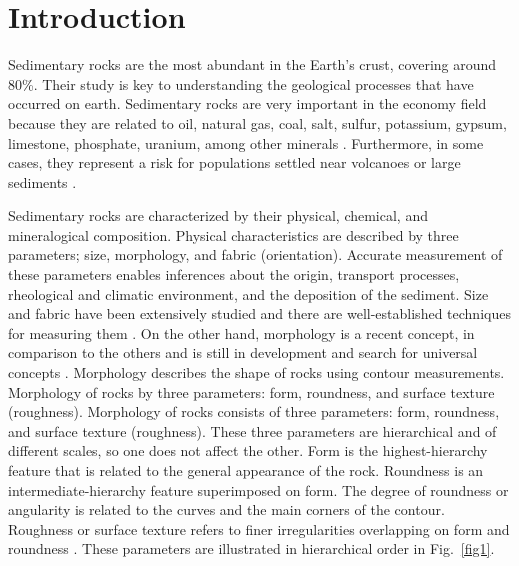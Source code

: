 \documentclass[conference]{IEEEtran}
\begin{document}
\IEEEpeerreviewmaketitle



\section{Introduction}

Sedimentary rocks are the most abundant in the Earth's crust, covering around 80\%. Their study is key to understanding the geological processes that have occurred on earth. Sedimentary rocks are very important in the economy field because they are related to oil, natural gas, coal, salt, sulfur, potassium, gypsum, limestone, phosphate, uranium, among other minerals \cite{b1}. Furthermore, in some cases, they represent a risk for populations settled near volcanoes or large sediments \cite{b2}.

Sedimentary rocks are characterized by their physical, chemical, and mineralogical composition. Physical characteristics are described by three parameters; size, morphology, and fabric (orientation). Accurate measurement of these parameters enables inferences about the origin,  transport processes, rheological and climatic environment, and the deposition of the sediment. Size and fabric have been extensively studied and there are well-established techniques for measuring them \cite{b3}. On the other hand, morphology is a recent concept, in comparison to the others and is still in development and search for universal concepts \cite{b4}.  Morphology describes the shape of rocks using contour measurements. Morphology of  rocks by three parameters: form, roundness, and surface texture (roughness). Morphology of rocks consists of three parameters: form, roundness, and surface texture (roughness). These three parameters are hierarchical and of different scales, so one does not affect the other. Form is the highest-hierarchy feature that is related to the general appearance of the rock. Roundness is an intermediate-hierarchy feature superimposed on form. The degree of roundness or angularity is related to the curves and the main corners of the contour. Roughness or surface texture refers to finer irregularities overlapping on form and roundness \cite{b5}. These parameters are illustrated in hierarchical order in Fig.~\ref{fig1}.
\end{document}
